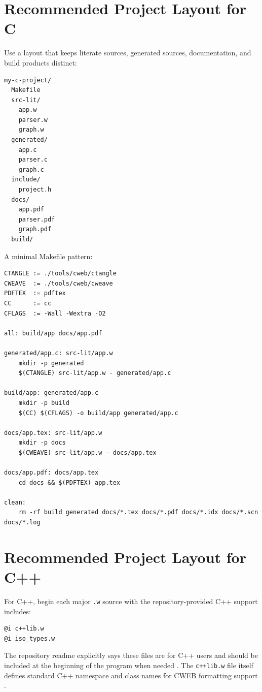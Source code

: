 \documentclass[11pt]{article}
\begin{document}
\section{Recommended Project Layout for C}

Use a layout that keeps literate sources, generated sources, documentation, and build products distinct:

\begin{verbatim}
my-c-project/
  Makefile
  src-lit/
    app.w
    parser.w
    graph.w
  generated/
    app.c
    parser.c
    graph.c
  include/
    project.h
  docs/
    app.pdf
    parser.pdf
    graph.pdf
  build/
\end{verbatim}

A minimal Makefile pattern:

\begin{verbatim}
CTANGLE := ./tools/cweb/ctangle
CWEAVE  := ./tools/cweb/cweave
PDFTEX  := pdftex
CC      := cc
CFLAGS  := -Wall -Wextra -O2

all: build/app docs/app.pdf

generated/app.c: src-lit/app.w
	mkdir -p generated
	$(CTANGLE) src-lit/app.w - generated/app.c

build/app: generated/app.c
	mkdir -p build
	$(CC) $(CFLAGS) -o build/app generated/app.c

docs/app.tex: src-lit/app.w
	mkdir -p docs
	$(CWEAVE) src-lit/app.w - docs/app.tex

docs/app.pdf: docs/app.tex
	cd docs && $(PDFTEX) app.tex

clean:
	rm -rf build generated docs/*.tex docs/*.pdf docs/*.idx docs/*.scn docs/*.log
\end{verbatim}

\section{Recommended Project Layout for C++}

For C++, begin each major \texttt{.w} source with the repository-provided C++ support includes:

\begin{verbatim}
@i c++lib.w
@i iso_types.w
\end{verbatim}

The repository readme explicitly says these files are for C++ users and should be included at the beginning of the program when needed \cite{repo-readme}. The \texttt{c++lib.w} file itself defines standard C++ namespace and class names for CWEB formatting support \cite{repo-cpplib}.
\end{document}
